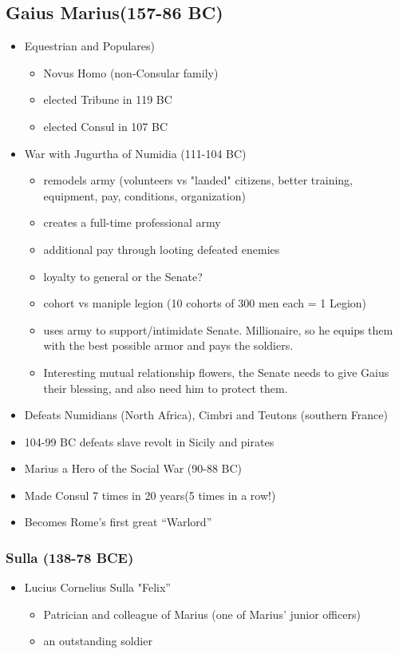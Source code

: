 \documentclass[12pt, twoside]{article}
\begin{document}
\subsection{Gaius Marius(157-86 BC)}
\begin{itemize}
\item Equestrian and Populares)
	\begin{itemize}
	\item Novus Homo (non-Consular family)
	\item elected Tribune in 119 BC
	\item elected Consul in 107 BC
	\end{itemize}
\item War with Jugurtha of Numidia (111-104 BC)
	\begin{itemize}
	\item remodels army (volunteers vs "landed" citizens, better training, equipment, pay, conditions, organization) 
	\item creates a full-time professional army
	\item additional pay through looting defeated enemies
	\item loyalty to general or the Senate?
	\item cohort vs maniple legion (10 cohorts of 300 men each = 1 Legion)
	\item uses army to support/intimidate Senate.  Millionaire, so he equips them with the best possible armor and pays the soldiers.
	\item Interesting mutual relationship flowers, the Senate needs to give Gaius their blessing, and also need him to protect them.
	\end{itemize}
\item Defeats Numidians (North Africa), Cimbri and Teutons (southern France)
\item 104-99 BC defeats slave revolt in Sicily and pirates
\item Marius a Hero of the Social War (90-88 BC)
\item Made Consul 7 times in 20 years(5 times in a row!)
\item Becomes Rome’s first great “Warlord”
\end{itemize}

\subsubsection{Sulla (138-78 BCE)}
\begin{itemize}
\item Lucius Cornelius Sulla "Felix”
	\begin{itemize}
	\item Patrician and colleague of Marius (one of Marius’ junior officers)
	\item an outstanding soldier
	\end{itemize}
\end{itemize}
\end{document}
